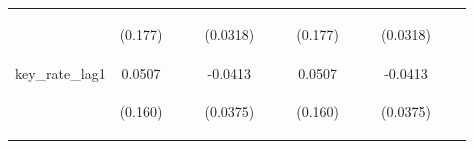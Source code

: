 \documentclass[]{article}
\begin{document}
\begin{center}
\begin{tabular}{lcccccccccccc}
\vspace{4pt} & \begin{footnotesize}(0.177)\end{footnotesize} & \begin{footnotesize}\end{footnotesize} & \begin{footnotesize}\end{footnotesize} & \begin{footnotesize}(0.0318)\end{footnotesize} & \begin{footnotesize}\end{footnotesize} & \begin{footnotesize}\end{footnotesize} & \begin{footnotesize}(0.177)\end{footnotesize} & \begin{footnotesize}\end{footnotesize} & \begin{footnotesize}\end{footnotesize} & \begin{footnotesize}(0.0318)\end{footnotesize} & \begin{footnotesize}\end{footnotesize} & \begin{footnotesize}\end{footnotesize} \\
key\_rate\_lag1 & 0.0507 &  &  & -0.0413 &  &  & 0.0507 &  &  & -0.0413 &  &  \\
\vspace{4pt} & \begin{footnotesize}(0.160)\end{footnotesize} & \begin{footnotesize}\end{footnotesize} & \begin{footnotesize}\end{footnotesize} & \begin{footnotesize}(0.0375)\end{footnotesize} & \begin{footnotesize}\end{footnotesize} & \begin{footnotesize}\end{footnotesize} & \begin{footnotesize}(0.160)\end{footnotesize} & \begin{footnotesize}\end{footnotesize} & \begin{footnotesize}\end{footnotesize} & \begin{footnotesize}(0.0375)\end{footnotesize} & \begin{footnotesize}\end{footnotesize} & \begin{footnotesize}\end{footnotesize} \\

\end{tabular}
\end{center}
\end{document}
